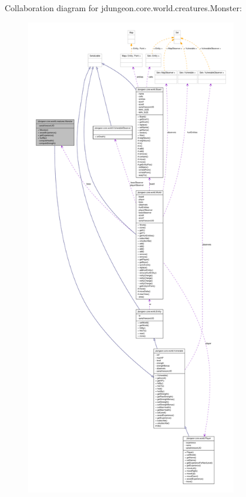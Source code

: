 Collaboration diagram for jdungeon.core.world.creatures.Monster:
\nopagebreak
\begin{figure}[H]
\begin{center}
\leavevmode
\includegraphics[height=600pt]{classjdungeon_1_1core_1_1world_1_1creatures_1_1_monster__coll__graph}
\end{center}
\end{figure}
